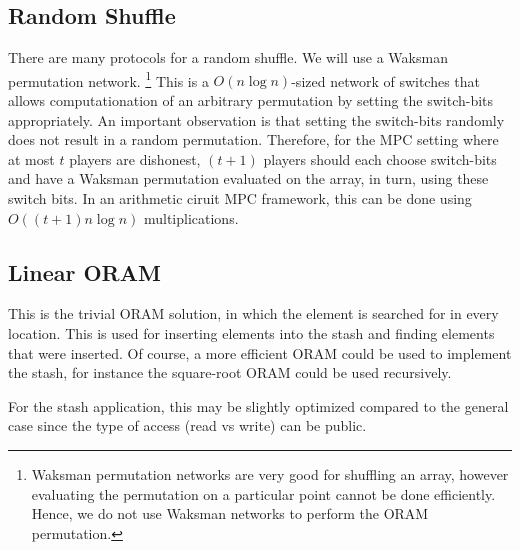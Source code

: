 \subsection{Random Shuffle}

There are many protocols for a random shuffle.
We will use a Waksman permutation network.
\footnote{Waksman permutation networks are very good for shuffling an array,
however evaluating the permutation on a particular point cannot be done
efficiently. Hence, we do not use Waksman networks to perform the ORAM permutation.}
This is a $O(n \log{n})$-sized network of switches that allows computationation
of an arbitrary permutation by setting the switch-bits appropriately.
An important observation is that setting the switch-bits randomly
does not result in a random permutation.
Therefore, for the MPC setting where at most $t$ players are dishonest,
$(t+1)$ players should each choose switch-bits and have a Waksman permutation
evaluated on the array, in turn, using these switch bits.  
In an arithmetic ciruit MPC framework, this can be done using $O( (t+1) n \log{n})$ multiplications.

\subsection{Linear ORAM}

This is the trivial ORAM solution, in which the element is searched for
in every location.
This is used for inserting elements into the stash and finding
elements that were inserted.
Of course, a more efficient ORAM could be used to implement the stash,
for instance the square-root ORAM could be used recursively.

For the stash application, this may be slightly optimized compared to the 
general case since the type of access (read vs write) can be public.

